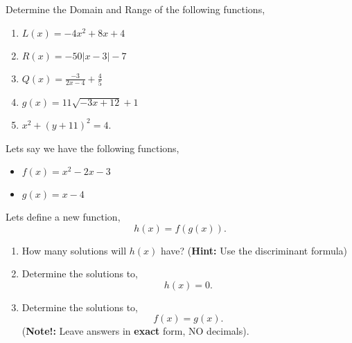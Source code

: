 \documentclass[12pt]{article} %
\begin{document}
\begin{qstn}
  Determine the Domain and Range of the following functions,
  \begin{enumerate}[label=(\alph*)]
    \item $L(x) = -4x^2 + 8x + 4$
    \item $R(x) = -50\left|x - 3\right| - 7$
    \item $Q(x) = \frac{-3}{2x - 4} + \frac{4}{5}$
    \item $g(x) = 11\sqrt{-3x + 12} + 1$ 
    \item $x^2 + (y + 11)^2 = 4$.
  \end{enumerate}
\end{qstn}

\begin{qstn}
  Lets say we have the following functions,
  \begin{itemize}
    \item $f(x) = x^2 - 2x - 3$
    \item $g(x) = x - 4$
  \end{itemize}
  Lets define a new function,
  \[
          h(x) = f(g(x))
  .\] 
  \begin{enumerate}[label=(\alph*)]
    \item How many solutions will $h(x)$ have? (\textbf{Hint:} Use the discriminant formula)
    \item Determine the solutions to,
      \[
            h(x) = 0
      .\] 
    \item Determine the solutions to,
       \[
            f(x) = g(x)
      .\]
      (\textbf{Note!:} Leave answers in \textbf{exact} form, NO decimals).

  \end{enumerate}
  
\end{qstn}
\end{document}
